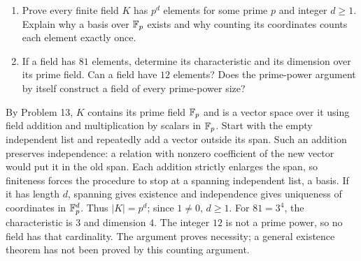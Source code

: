\begin{enumerate}
\item Prove every finite field $K$ has $p^d$ elements for some prime
$p$ and integer $d\ge1$. Explain why a basis over $\mathbb F_p$ exists and
why counting its coordinates counts each element exactly once. 
\item If a field has $81$ elements, determine its characteristic and its
dimension over its prime field. Can a field have $12$ elements?
Does the prime-power argument by itself construct a field of every
prime-power size? 
\end{enumerate}
\begin{solution}
By Problem 13, $K$ contains its prime field $\mathbb F_p$ and is a vector
space over it using field addition and multiplication by scalars in
$\mathbb F_p$. Start with the empty independent list and repeatedly add a
vector outside its span. Such an addition preserves independence:
a relation with nonzero coefficient of the new vector would put it
in the old span. Each addition strictly enlarges the span, so finiteness
forces the procedure to stop at a spanning independent list, a basis.
If it has length $d$, spanning gives existence and independence gives
uniqueness of coordinates in $\mathbb F_p^d$. Thus $|K|=p^d$; since $1\ne0$,
$d\ge1$. For $81=3^4$, the characteristic is $3$ and dimension $4$.
The integer $12$ is not a prime power, so no field has that cardinality.
The argument proves necessity; a general existence theorem has not
been proved by this counting argument.
\end{solution}

